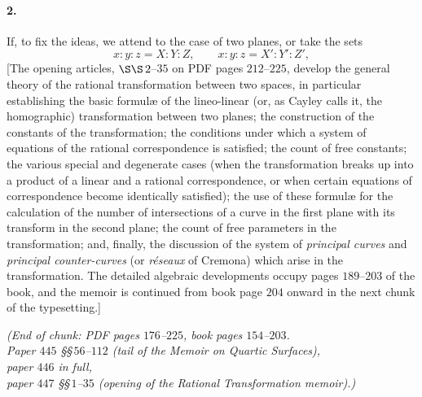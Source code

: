 \documentclass[11pt,a4paper]{article}
\begin{document}
\medskip

\paragraph{2.}
If, to fix the ideas, we attend to the case of two planes, or take the sets
\[
x : y : z = X : Y : Z,\qquad x : y : z = X' : Y' : Z',
\]
[The opening articles, $\S\S\,2$--$35$ on PDF pages $212$--$225$, develop the general
theory of the rational transformation between two spaces, in particular establishing
the basic formul\ae{} of the lineo-linear (or, as Cayley calls it, the homographic)
transformation between two planes; the construction of the constants of the
transformation; the conditions under which a system of equations of the rational
correspondence is satisfied; the count of free constants; the various special and
degenerate cases (when the transformation breaks up into a product of a linear and a
rational correspondence, or when certain equations of correspondence become
identically satisfied); the use of these formul\ae{} for the calculation of the
number of intersections of a curve in the first plane with its transform in the
second plane; the count of free parameters in the transformation; and, finally, the
discussion of the system of \textit{principal curves} and \textit{principal counter-curves}
(or \textit{r\'eseaux} of Cremona) which arise in the transformation. The detailed
algebraic developments occupy pages $189$--$203$ of the book, and the memoir is
continued from book page $204$ onward in the next chunk of the typesetting.]

\medskip

\noindent\textit{(End of chunk: PDF pages $176$--$225$, book pages $154$--$203$.\\
Paper $445$ \S\S\,$56$--$112$ (tail of the Memoir on Quartic Surfaces),\\
paper $446$ in full,\\
paper $447$ \S\S\,$1$--$35$ (opening of the Rational Transformation memoir).)}
\end{document}

